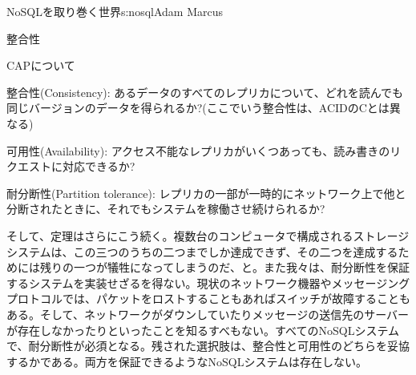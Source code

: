 \begin{aosachapter}{NoSQLを取り巻く世界}{s:nosql}{Adam Marcus}
\begin{aosasect1}{整合性}
\begin{aosasect2}{CAPについて}
\begin{aosadescription}

  \item{整合性(Consistency)}: あるデータのすべてのレプリカについて、どれを読んでも同じバージョンのデータを得られるか?(ここでいう整合性は、ACIDのCとは異なる)

  \item{可用性(Availability)}: アクセス不能なレプリカがいくつあっても、読み書きのリクエストに対応できるか?

  \item{耐分断性(Partition tolerance)}: レプリカの一部が一時的にネットワーク上で他と分断されたときに、それでもシステムを稼働させ続けられるか?

\end{aosadescription}

そして、定理はさらにこう続く。複数台のコンピュータで構成されるストレージシステムは、この三つのうちの二つまでしか達成できず、その二つを達成するためには残りの一つが犠牲になってしまうのだ、と。また我々は、耐分断性を保証するシステムを実装せざるを得ない。現状のネットワーク機器やメッセージングプロトコルでは、パケットをロストすることもあればスイッチが故障することもある。そして、ネットワークがダウンしていたりメッセージの送信先のサーバーが存在しなかったりといったことを知るすべもない。すべてのNoSQLシステムで、耐分断性が必須となる。残された選択肢は、整合性と可用性のどちらを妥協するかである。両方を保証できるようなNoSQLシステムは存在しない。


\end{aosasect2}
\end{aosasect1}
\end{aosachapter}
